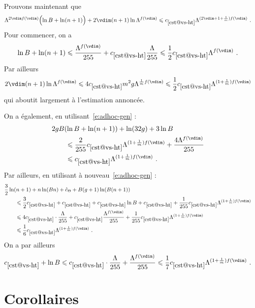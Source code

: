 \medskip

Prouvons maintenant que
\begin{equation} \label{e:ht-T'-adhoc}
  \Lambda^{2\vdim f(\vdim)} \Bigl( \ln B + \ln(\dimp + 1) \Bigr)
  + 2\vdim (\dimp + 1) \ln \Lambda^{f(\vdim)}
  \le
  \cst{vs-ht} \Lambda^{(2\vdim + 1 + \frac1\puiss) f(\vdim)}
  \pmm.
\end{equation}
Pour commencer, on a
\begin{align}
  \ln B + \ln(\dimp + 1)
  \le
  \frac{\Lambda^{f(\vdim)}}{255}
  + \cst{vs-ht} \frac\Lambda{255}
  \le
  \frac12 \cst{vs-ht} \Lambda^{f(\vdim)}
  \pmm.
\end{align}
Par ailleurs
\begin{equation}
  2 \vdim (\dimp + 1) \ln \Lambda^{f(\vdim)}
  \le
  4 \cst{vs-ht} \puiss^2 \genre \Lambda^{\frac1\puiss f(\vdim)}
  \le
  \frac12 \cst{vs-ht} \Lambda^{(1 + \frac1\puiss) f(\vdim)}
\end{equation}
qui aboutit largement à l'estimation annoncée.

\medskip

On a également, en utilisant~\eqref{e:adhoc-gen} :
\begin{align}
  & 2 \genre B ( \ln B + \ln( \dimp + 1 ) ) + \ln(32\genre) + 3 \ln B
  \\ & \qquad \le
  \frac2{255} \cst{vs-ht} \Lambda^{(1 + \frac1\puiss) f(\vdim)}
  + \frac{ 4 \Lambda^{f(\vdim)} }{255}
  \\ & \qquad \le \label{e:ht-Pv-adhoc}
  \cst{vs-ht} \Lambda^{(1 + \frac1\puiss) f(\vdim)}
  \pmm.
\end{align}
Par ailleurs, en utilisant à nouveau~\eqref{e:adhoc-gen} :
\begin{align}
  & \frac32 \ln(\dimp+1)
  + \dimp \ln(B\dimp)
  + \htcmp
  + B (\genre + 1) \ln (B (\dimp+1))
  \\ & \qquad \le
  \frac32 \cst{vs-ht}
  + \cst{vs-ht} + \cst{vs-ht} \ln B
  + \cst{vs-ht} 
  + \frac1{255} \cst{vs-ht} \Lambda^{(1 + \frac1\puiss) f(\vdim)}
  \\ & \qquad \le
  4 \cst{vs-ht} \cdot \frac\Lambda{255}
  + \cst{vs-ht} \frac{ \Lambda^{f(\vdim)} }{ 255 }
  + \frac1{255} \cst{vs-ht} \Lambda^{(1 + \frac1\puiss) f(\vdim)}
  \\ & \qquad \le \label{e:ratfh1a-adhoc}
  \frac16 \cst{vs-ht} \Lambda^{(1 + \frac1\puiss) f(\vdim)}
  \pmm.
\end{align}
On a par ailleurs
\begin{equation} \label{e:extra-beta-adhoc}
  \cst{vs-ht} + \ln B
  \le
  \cst{vs-ht} \cdot \frac\Lambda{255}
  + \frac{ \Lambda^{f(\vdim)} }{ 255 }
  \le
  \frac17 \cst{vs-ht} \Lambda^{(1 + \frac1\puiss) f(\vdim)}
  \pmm.
\end{equation}

\cleardoublepage


\section{Corollaires} \label{sec:vojta-coro}


\endinput

